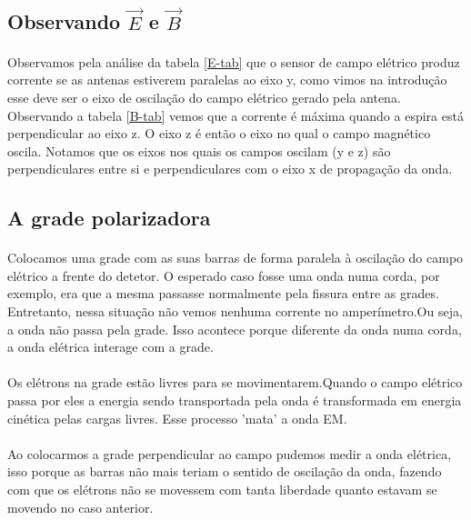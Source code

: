 \documentclass[a4paper,11pt]{article}
\begin{document}
	\subsection{Observando $\vec{E}$ e $\vec{B}$}	
	
		\paragraph{}Observamos pela análise da tabela \ref{E-tab} que o sensor de campo elétrico produz corrente se as antenas estiverem paralelas ao eixo y, como vimos na introdução esse deve ser o eixo de oscilação do campo elétrico gerado pela antena. Observando a tabela \ref{B-tab} vemos que a corrente é máxima quando a espira está perpendicular ao eixo z. O eixo z é então o eixo no qual o campo magnético oscila. Notamos que os eixos nos quais os campos oscilam (y e z) são perpendiculares entre si e perpendiculares com o eixo x de propagação da onda.
		
	\subsection{A grade polarizadora}
		\paragraph{}	Colocamos uma grade com as suas barras de forma paralela à oscilação do campo elétrico a frente do detetor. O esperado caso fosse uma onda numa corda, por exemplo, era que a mesma passasse normalmente pela fissura entre as grades. Entretanto, nessa situação não vemos nenhuma corrente no amperímetro.Ou seja, a onda não passa pela grade. Isso acontece porque diferente da onda numa corda, a onda elétrica interage com a grade. 
	\paragraph{} Os elétrons na grade estão livres para se movimentarem.Quando o campo elétrico passa por eles a energia sendo transportada pela onda é transformada em energia cinética pelas cargas livres. Esse processo 'mata' a onda EM.
	
	\paragraph{} Ao colocarmos a grade perpendicular ao campo pudemos medir a onda elétrica, isso porque as barras não mais teriam o sentido de oscilação da onda, fazendo com que os elétrons não se movessem com tanta liberdade quanto estavam se movendo no caso anterior. 
	
\end{document}
